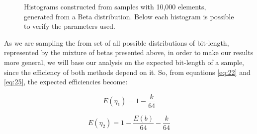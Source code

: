 \documentclass[10pt]{article}
\begin{document}
\begin{figure}[ht]
{  }
  \caption{Histograms constructed from samples with 10,000 elements, generated from a Beta distribution. Below each histogram is possible to verify the parameters used.}
  \label{fig:02}
\end{figure}

As we are sampling the from set of all possible distributions of bit-length, represented by the mixture of betas presented above, in order to make our results more general, we will base our analysis on the expected bit-length of a sample, since the efficiency of both methods  depend on it. So, from equations \ref{eq:22} and \ref{eq:25}, the expected efficiencies become: 
 
\begin{equation}\label{eq:56}
 E(\eta_1) = 1 - \frac{k}{64}
\end{equation}

\begin{equation}\label{eq:57}
 E(\eta_2) = 1 - \frac{E(b)}{64} - \frac{k}{64}
\end{equation}
\end{document}
